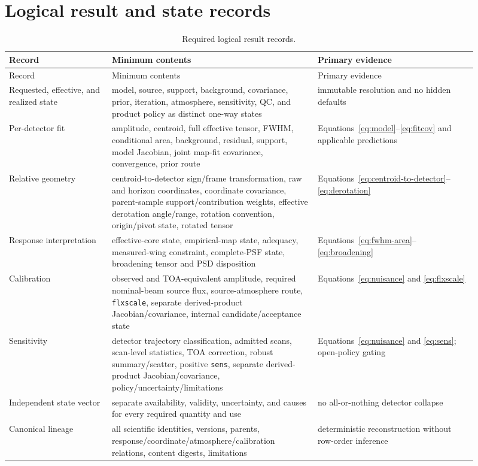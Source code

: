 \documentclass[10pt]{article}
\begin{document}
\section{Logical result and state records}

\begin{longtable}{L{0.20\linewidth}L{0.40\linewidth}L{0.31\linewidth}}
\caption{Required logical result records.}\label{tab:records}\\
\toprule Record & Minimum contents & Primary evidence \\
\midrule
\endfirsthead
\toprule Record & Minimum contents & Primary evidence \\
\midrule
\endhead
Requested, effective, and realized state & model, source, support, background, covariance, prior, iteration, atmosphere, sensitivity, QC, and product policy as distinct one-way states & immutable resolution and no hidden defaults \\
Per-detector fit & amplitude, centroid, full effective tensor, FWHM, conditional area, background, residual, support, model Jacobian, joint map-fit covariance, convergence, prior route & Equations~\ref{eq:model}--\ref{eq:fitcov} and applicable predictions \\
Relative geometry & centroid-to-detector sign/frame transformation, raw and horizon coordinates, coordinate covariance, parent-sample support/contribution weights, effective derotation angle/range, rotation convention, origin/pivot state, rotated tensor & Equations~\ref{eq:centroid-to-detector}--\ref{eq:derotation} \\
Response interpretation & effective-core state, empirical-map state, adequacy, measured-wing constraint, complete-PSF state, broadening tensor and PSD disposition & Equations~\ref{eq:fwhm-area}--\ref{eq:broadening} \\
Calibration & observed and TOA-equivalent amplitude, required nominal-beam source flux, source-atmosphere route, \texttt{flxscale}, separate derived-product Jacobian/covariance, internal candidate/acceptance state & Equations~\ref{eq:nuisance} and \ref{eq:flxscale} \\
Sensitivity & detector trajectory classification, admitted scans, scan-level statistics, TOA correction, robust summary/scatter, positive \texttt{sens}, separate derived-product Jacobian/covariance, policy/uncertainty/limitations & Equations~\ref{eq:nuisance} and \ref{eq:sens}; open-policy gating \\
Independent state vector & separate availability, validity, uncertainty, and causes for every required quantity and use & no all-or-nothing detector collapse \\
Canonical lineage & all scientific identities, versions, parents, response/coordinate/atmosphere/calibration relations, content digests, limitations & deterministic reconstruction without row-order inference \\
\bottomrule
\end{longtable}
\end{document}
